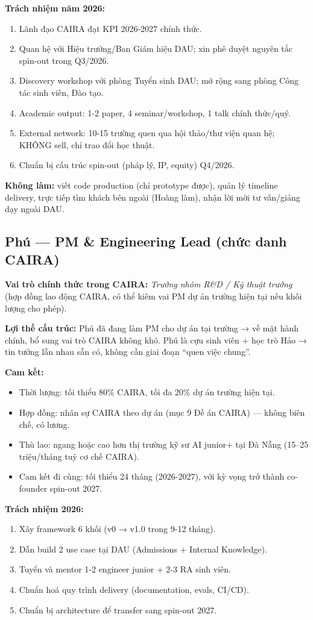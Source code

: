 \documentclass[11pt,a4paper]{article}
\begin{document}
\textbf{Trách nhiệm năm 2026:}
\begin{enumerate}
\item Lãnh đạo CAIRA đạt KPI 2026-2027 chính thức.
\item Quan hệ với Hiệu trưởng/Ban Giám hiệu DAU; xin phê duyệt nguyên tắc spin-out trong Q3/2026.
\item Discovery workshop với phòng Tuyển sinh DAU; mở rộng sang phòng Công tác sinh viên, Đào tạo.
\item Academic output: 1-2 paper, 4 seminar/workshop, 1 talk chính thức/quý.
\item External network: 10-15 trường quen qua hội thảo/thư viện quan hệ; KHÔNG sell, chỉ trao đổi học thuật.
\item Chuẩn bị cấu trúc spin-out (pháp lý, IP, equity) Q4/2026.
\end{enumerate}

\textbf{Không làm:} viết code production (chỉ prototype được), quản lý timeline delivery, trực tiếp tìm khách bên ngoài (Hoàng làm), nhận lời mời tư vấn/giảng dạy ngoài DAU.

\subsection{Phú — PM \& Engineering Lead (chức danh CAIRA)}

\textbf{Vai trò chính thức trong CAIRA:} \textit{Trưởng nhóm R\&D / Kỹ thuật trưởng} (hợp đồng lao động CAIRA, có thể kiêm vai PM dự án trường hiện tại nếu khối lượng cho phép).

\textbf{Lợi thế cấu trúc:} Phú đã đang làm PM cho dự án tại trường → về mặt hành chính, bổ sung vai trò CAIRA không khó. Phú là cựu sinh viên + học trò Hảo → tin tưởng lẫn nhau sẵn có, không cần giai đoạn ``quen việc chung''.

\textbf{Cam kết:}
\begin{itemize}
\item Thời lượng: tối thiểu 80\% CAIRA, tối đa 20\% dự án trường hiện tại.
\item Hợp đồng: nhân sự CAIRA theo dự án (mục 9 Đề án CAIRA) — không biên chế, có lương.
\item Thù lao: ngang hoặc cao hơn thị trường kỹ sư AI junior+ tại Đà Nẵng (15--25 triệu/tháng tuỳ cơ chế CAIRA).
\item Cam kết đi cùng: tối thiểu 24 tháng (2026-2027), với kỳ vọng trở thành co-founder spin-out 2027.
\end{itemize}

\textbf{Trách nhiệm 2026:}
\begin{enumerate}
\item Xây framework 6 khối (v0 → v1.0 trong 9-12 tháng).
\item Dẫn build 2 use case tại DAU (Admissions + Internal Knowledge).
\item Tuyển và mentor 1-2 engineer junior + 2-3 RA sinh viên.
\item Chuẩn hoá quy trình delivery (documentation, evals, CI/CD).
\item Chuẩn bị architecture để transfer sang spin-out 2027.
\end{enumerate}
\end{document}
